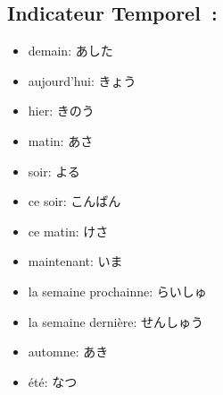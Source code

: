 \documentclass{article}
\begin{document}
\begin{CJK}{UTF8}{min}
    \subsection{Indicateur Temporel~:}
    \begin{itemize}
       \item demain: あした
        \item aujourd'hui: きょう
        \item hier: きのう
        \item matin: あさ
        \item soir: よる
        \item ce soir: こんばん
        \item ce matin: けさ
        \item maintenant: いま
        \item la semaine prochainne: らいしゅ
        \item la semaine dernière: せんしゅう
        \item automne: あき
        \item été: なつ
   \end{itemize}

\end{CJK}
\end{document}
